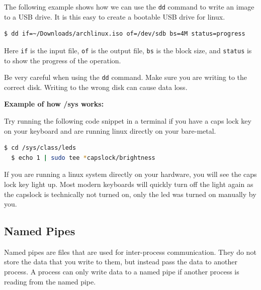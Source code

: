 The following example shows how we can use the \texttt{dd} command to write an image
to a USB drive.
It is this easy to create a bootable USB drive for linux.

\begin{lstlisting}[language=bash]
  $ dd if=~/Downloads/archlinux.iso of=/dev/sdb bs=4M status=progress
\end{lstlisting}

Here \texttt{if} is the input file, \texttt{of} is the output file, \texttt{bs} is the block size, and \texttt{status} is to show the progress of the operation.

\begin{warn}
  Be very careful when using the \texttt{dd} command.
  Make sure you are writing to the correct disk.
  Writing to the wrong disk can cause data loss.
\end{warn}

\textbf{Example of how /sys works:}

Try running the following code snippet in a terminal if you have a caps lock key on your keyboard and are running linux directly on your bare-metal.

\begin{lstlisting}[language=bash]
  $ cd /sys/class/leds
  $ echo 1 | sudo tee *capslock/brightness
\end{lstlisting}

If you are running a linux system directly on your hardware, you will see the caps lock key light up.
Most modern keyboards will quickly turn off the light again as the capslock is technically not turned on, only the led was turned on manually by you.

\subsection{Named Pipes}

Named pipes
are files that are used for inter-process communication.
They do not store the data that you write to them, but instead pass the data to another process.
A process can only write data to a named pipe if another process is reading from the named pipe.


